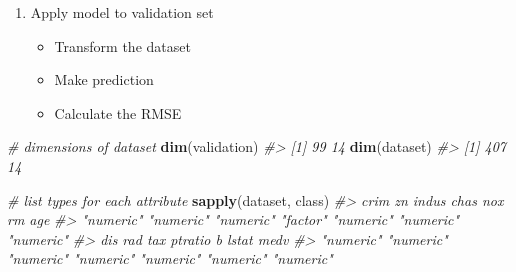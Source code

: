 \documentclass[]{book}
\newenvironment{Shaded}{\begin{snugshade}}{\end{snugshade}}
\newcommand{\CommentTok}[1]{\textcolor[rgb]{0.56,0.35,0.01}{\textit{#1}}}
\newcommand{\DataTypeTok}[1]{\textcolor[rgb]{0.13,0.29,0.53}{#1}}
\newcommand{\DecValTok}[1]{\textcolor[rgb]{0.00,0.00,0.81}{#1}}
\newcommand{\FloatTok}[1]{\textcolor[rgb]{0.00,0.00,0.81}{#1}}
\newcommand{\KeywordTok}[1]{\textcolor[rgb]{0.13,0.29,0.53}{\textbf{#1}}}
\newcommand{\NormalTok}[1]{#1}
\newcommand{\OperatorTok}[1]{\textcolor[rgb]{0.81,0.36,0.00}{\textbf{#1}}}
\newcommand{\OtherTok}[1]{\textcolor[rgb]{0.56,0.35,0.01}{#1}}
\newcommand{\StringTok}[1]{\textcolor[rgb]{0.31,0.60,0.02}{#1}}
\providecommand{\tightlist}{%
  \setlength{\itemsep}{0pt}\setlength{\parskip}{0pt}}
\begin{document}
\begin{enumerate}
\def\labelenumi{\arabic{enumi}.}
\setcounter{enumi}{11}
\tightlist
\item
  Apply model to validation set

  \begin{itemize}
  \tightlist
  \item
    Transform the dataset
  \item
    Make prediction
  \item
    Calculate the RMSE
  \end{itemize}
\end{enumerate}

\begin{Shaded}
\end{Shaded}

\begin{Shaded}
\begin{Highlighting}[]
\CommentTok{# dimensions of dataset}
\KeywordTok{dim}\NormalTok{(validation)}
\CommentTok{#> [1] 99 14}
\KeywordTok{dim}\NormalTok{(dataset)}
\CommentTok{#> [1] 407  14}
\end{Highlighting}
\end{Shaded}

\begin{Shaded}
\begin{Highlighting}[]
\CommentTok{# list types for each attribute}
\KeywordTok{sapply}\NormalTok{(dataset, class)}
\CommentTok{#>      crim        zn     indus      chas       nox        rm       age }
\CommentTok{#> "numeric" "numeric" "numeric"  "factor" "numeric" "numeric" "numeric" }
\CommentTok{#>       dis       rad       tax   ptratio         b     lstat      medv }
\CommentTok{#> "numeric" "numeric" "numeric" "numeric" "numeric" "numeric" "numeric"}
\end{Highlighting}
\end{Shaded}
\end{document}
